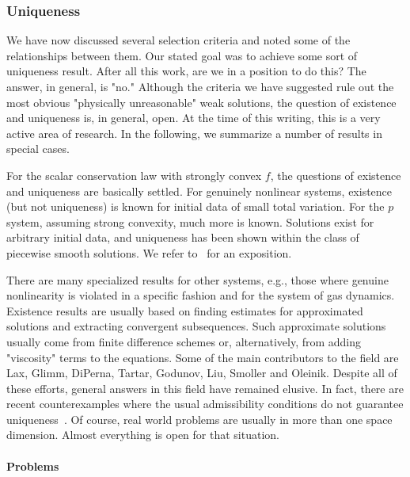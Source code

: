 \subsubsection{Uniqueness}\label{subsec:conservation-uniqueness}

We have now discussed several selection criteria and noted some of the relationships between them. Our stated goal was to achieve some sort of uniqueness result. After all this work, are we in a position to do this? The answer, in general, is "no." Although the criteria we have suggested rule out the most obvious "physically unreasonable" weak solutions, the question of existence and uniqueness is, in general, open. At the time of this writing, this is a very active area of research. In the following, we summarize a number of results in special cases.

For the scalar conservation law with strongly convex $f$, the questions of existence and uniqueness are basically settled. For genuinely nonlinear systems, existence (but not uniqueness) is known for initial data of small total variation. For the $p$ system, assuming strong convexity, much more is known. Solutions exist for arbitrary initial data, and uniqueness has been shown within the class of piecewise smooth solutions. We refer to~\cite{Sm} for an exposition.

There are many specialized results for other systems, e.g., those where genuine nonlinearity is violated in a specific fashion and for the system of gas dynamics. Existence results are usually based on finding estimates for approximated solutions and extracting convergent subsequences. Such approximate solutions usually come from finite difference schemes or, alternatively, from adding "viscosity" terms to the equations. Some of the main contributors to the field are Lax, Glimm, DiPerna, Tartar, Godunov, Liu, Smoller and Oleinik. Despite all of these efforts, general answers in this field have remained elusive. In fact, there are recent counterexamples where the usual admissibility conditions do not guarantee uniqueness~\cite{Se}. Of course, real world problems are usually in more than one space dimension. Almost everything is open for that situation.

\paragraph*{Problems}

